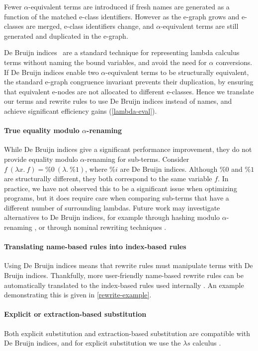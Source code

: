 Fewer $\alpha$-equivalent terms are introduced if fresh names are generated as a function of the matched e-class identifiers.
However as the e-graph grows and e-classes are merged, e-class identifiers change, and $\alpha$-equivalent terms are still generated and duplicated in the e-graph.

De Bruijn indices~\cite{DEBRUIJN1972381} are a standard technique for representing lambda calculus terms without naming the bound variables, and avoid the need for $\alpha$ conversions.
If De Bruijn indices enable two $\alpha$-equivalent terms to be structurally equivalent, the standard e-graph congruence invariant prevents their duplication, by ensuring that equivalent e-nodes are not allocated to different e-classes.
Hence we translate our terms and rewrite rules to use De Bruijn indices instead of names, and achieve significant efficiency gains (\cref{lambda-eval}).

\paragraph{True equality modulo $\alpha$-renaming}
While De Bruijn indices give a significant performance improvement, they do not provide equality modulo $\alpha$-renaming for sub-terms.
Consider  $f~(\lambda x.~f) = \%0~(\lambda.~\%1)$, where $\%i$ are De Bruijn indices.
Although $\%0$ and $\%1$ are structurally different, they both correspond to the same variable $f$.
In practice, we have not observed this to be a significant issue when optimizing \Rise{} programs, but it does require care when comparing sub-terms that have a different number of surrounding lambdas.
Future work may investigate alternatives to De Bruijn indices, for example through hashing modulo $\alpha$-renaming \cite{maziarz2021-hash-mod-alpha-eq}, or through nominal rewriting techniques \cite{fernandez2007-nominal-rewriting}.

\paragraph{Translating name-based rules into index-based rules}
Using De Bruijn indices means that rewrite rules must manipulate terms with De Bruijn indices.
Thankfully, more user-friendly name-based rewrite rules can be automatically translated to the index-based rules used internally \cite{bonelli2000-bruijn-rewriting}.
An example demonstrating this is given in \cref{rewrite-example}.

\paragraph{Explicit or extraction-based substitution}
Both explicit substitution and extraction-based substitution are compatible with De Bruijn indices, and for explicit substitution we use the $\lambda s$ calculus \cite{kamareddine1995-lambda-v}.

